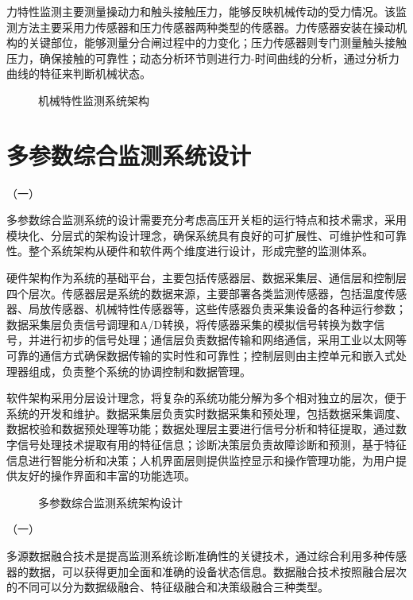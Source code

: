 力特性监测主要测量操动力和触头接触压力，能够反映机械传动的受力情况。该监测方法主要采用力传感器和压力传感器两种类型的传感器。力传感器安装在操动机构的关键部位，能够测量分合闸过程中的力变化；压力传感器则专门测量触头接触压力，确保接触的可靠性；动态分析环节则进行力-时间曲线的分析，通过分析力曲线的特征来判断机械状态。

\begin{figure}[h]
\centering
\caption{机械特性监测系统架构}
\label{fig:mechanical_monitoring}
\end{figure}

\section{多参数综合监测系统设计}

（一）

多参数综合监测系统的设计需要充分考虑高压开关柜的运行特点和技术需求，采用模块化、分层式的架构设计理念，确保系统具有良好的可扩展性、可维护性和可靠性。整个系统架构从硬件和软件两个维度进行设计，形成完整的监测体系。

硬件架构作为系统的基础平台，主要包括传感器层、数据采集层、通信层和控制层四个层次。传感器层是系统的数据来源，主要部署各类监测传感器，包括温度传感器、局放传感器、机械特性传感器等，这些传感器负责采集设备的各种运行参数；数据采集层负责信号调理和A/D转换，将传感器采集的模拟信号转换为数字信号，并进行初步的信号处理；通信层负责数据传输和网络通信，采用工业以太网等可靠的通信方式确保数据传输的实时性和可靠性；控制层则由主控单元和嵌入式处理器组成，负责整个系统的协调控制和数据管理。

软件架构采用分层设计理念，将复杂的系统功能分解为多个相对独立的层次，便于系统的开发和维护。数据采集层负责实时数据采集和预处理，包括数据采集调度、数据校验和数据预处理等功能；数据处理层主要进行信号分析和特征提取，通过数字信号处理技术提取有用的特征信息；诊断决策层负责故障诊断和预测，基于特征信息进行智能分析和决策；人机界面层则提供监控显示和操作管理功能，为用户提供友好的操作界面和丰富的功能选项。

\begin{figure}[h]
\centering
\caption{多参数综合监测系统架构设计}
\label{fig:system_architecture}
\end{figure}

（一）

多源数据融合技术是提高监测系统诊断准确性的关键技术，通过综合利用多种传感器的数据，可以获得更加全面和准确的设备状态信息。数据融合技术按照融合层次的不同可以分为数据级融合、特征级融合和决策级融合三种类型。

